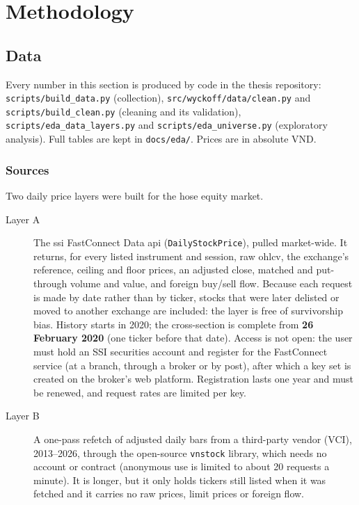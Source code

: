 \chapter{Methodology}
\label{ch:methodology}

\section{Data}
\label{sec:data}

Every number in this section is produced by code in the thesis repository:
\texttt{scripts/build\_data.py} (collection), \texttt{src/wyckoff/data/clean.py} and
\texttt{scripts/build\_clean.py} (cleaning and its validation),
\texttt{scripts/eda\_data\_layers.py} and \texttt{scripts/eda\_universe.py} (exploratory analysis).
Full tables are kept in \texttt{docs/eda/}. Prices are in absolute VND.

\subsection{Sources}

Two daily price layers were built for the \gls{hose} equity market.

\begin{description}
  \item[Layer A] The \gls{ssi} FastConnect Data \gls{api} (\texttt{DailyStockPrice}), pulled
    market-wide. It returns, for every listed instrument and session, raw \gls{ohlcv}, the
    exchange's reference, ceiling and floor prices, an adjusted close, matched and put-through
    volume and value, and foreign buy/sell flow. Because each request is made by date rather
    than by ticker, stocks that were later delisted or moved to another exchange are included:
    the layer is free of survivorship bias. History starts in 2020; the cross-section is complete
    from \textbf{26 February 2020} (one ticker before that date). Access is not open: the user
    must hold an SSI securities account and register for the FastConnect service (at a branch,
    through a broker or by post), after which a key set is created on the broker's web platform.
    Registration lasts one year and must be renewed, and request rates are limited per key.
  \item[Layer B] A one-pass refetch of adjusted daily bars from a third-party vendor (VCI),
    2013--2026, through the open-source \texttt{vnstock} library, which needs no account or
    contract (anonymous use is limited to about 20 requests a minute). It is longer, but it only
    holds tickers still listed when it was fetched and it carries no raw prices, limit prices or
    foreign flow.
\end{description}

